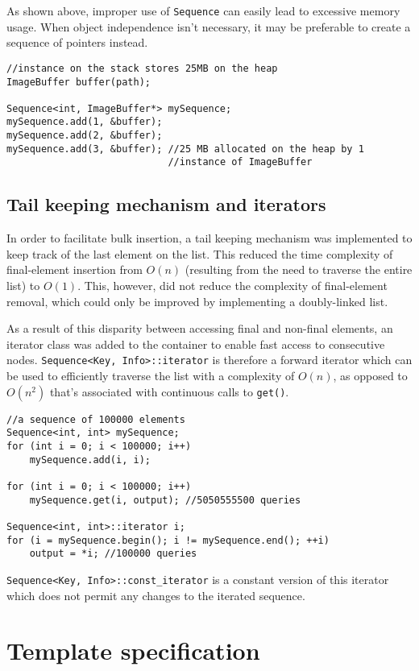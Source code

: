 ﻿\documentclass{article}
\begin{document}
As shown above, improper use of {\tt Sequence} can easily lead to excessive
memory usage. When object independence isn't necessary, it may be preferable
to create a sequence of pointers instead.

\begin{verbatim}
//instance on the stack stores 25MB on the heap
ImageBuffer buffer(path);

Sequence<int, ImageBuffer*> mySequence;
mySequence.add(1, &buffer);
mySequence.add(2, &buffer);
mySequence.add(3, &buffer); //25 MB allocated on the heap by 1
                            //instance of ImageBuffer
\end{verbatim}

\subsection{Tail keeping mechanism and iterators}

In order to facilitate bulk insertion, a tail keeping mechanism was implemented
to keep track of the last element on the list. This reduced the time complexity
of final-element insertion from $O(n)$ (resulting from the need to traverse the
entire list) to $O(1)$. This, however, did not reduce the complexity of
final-element removal, which could only be improved by implementing a
doubly-linked list.

As a result of this disparity between accessing final and non-final elements,
an iterator class was added to the container to enable fast access to
consecutive nodes. {\tt Sequence<Key, Info>::iterator} is therefore a forward
iterator which can be used to efficiently traverse the list with a complexity of
$O(n)$, as opposed to $O(n^2)$ that's associated with continuous calls to
{\tt get()}.

\begin{verbatim}
//a sequence of 100000 elements
Sequence<int, int> mySequence;
for (int i = 0; i < 100000; i++)
    mySequence.add(i, i);

for (int i = 0; i < 100000; i++)
    mySequence.get(i, output); //5050555500 queries

Sequence<int, int>::iterator i;
for (i = mySequence.begin(); i != mySequence.end(); ++i)
    output = *i; //100000 queries
\end{verbatim}

{\tt Sequence<Key, Info>::const\_iterator} is a constant version of this iterator
which does not permit any changes to the iterated sequence.

\section{Template specification}
\end{document}
